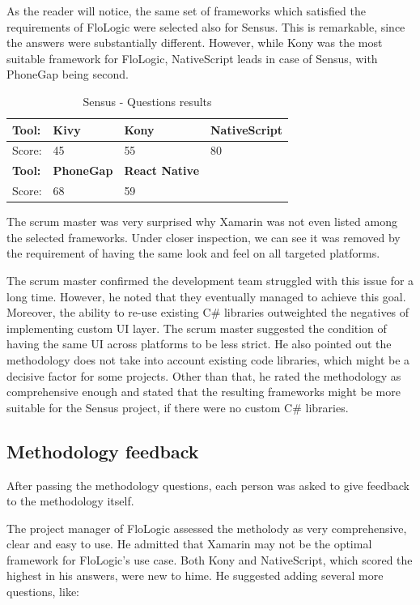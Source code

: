 \documentclass[english,master,public,dept460,male,cpdeclaration,oneside]{diploma}
\begin{document}
As the reader will notice, the same set of frameworks which satisfied the requirements of FloLogic were selected also for Sensus. This is remarkable, since the answers were substantially different. However, while Kony was the most suitable framework for FloLogic, NativeScript leads in case of Sensus, with PhoneGap being second.

\begin{table}[!h]
	\centering
	\caption{Sensus - Questions results}
	\label{table:sensusResults}
	\begin{tabular}{p{4cm} | p{3cm} | p{3cm} | p{3cm}}
		\toprule		
		\textbf{Tool:} & \textbf{Kivy} & \textbf{Kony} & \textbf{NativeScript} \\ 
		\midrule
		Score: & 45 & 55 & 80 \\ 
		\midrule
		\textbf{Tool:} & \textbf{PhoneGap} & \textbf{React Native} & \\
		\midrule
		Score: & 68 & 59 & \\
		\midrule
	\end{tabular}
\end{table}

The scrum master was very surprised why Xamarin was not even listed among the selected frameworks. Under closer inspection, we can see it was removed by the requirement of having the same look and feel on all targeted platforms.

The scrum master confirmed the development team struggled with this issue for a long time. However, he noted that they eventually managed to achieve this goal. Moreover, the ability to re-use existing C\# libraries outweighted the negatives of implementing custom UI layer. The scrum master suggested the condition of having the same UI across platforms to be less strict. He also pointed out the methodology does not take into account existing code libraries, which might be a decisive factor for some projects. Other than that, he rated the methodology as comprehensive enough and stated that the resulting frameworks might be more suitable for the Sensus project, if there were no custom C\# libraries.

\subsection{Methodology feedback}

After passing the methodology questions, each person was asked to give feedback to the methodology itself.

The project manager of FloLogic assessed the metholody as very comprehensive, clear and easy to use. He admitted that Xamarin may not be the optimal framework for FloLogic's use case. Both Kony and NativeScript, which scored the highest in his answers, were new to hime. He suggested adding several more questions, like:
\end{document}
